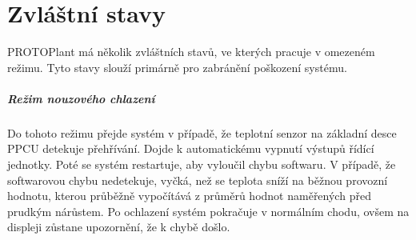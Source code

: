 \chapter{Zvláštní stavy}
PROTOPlant má několik zvláštních stavů, ve kterých pracuje v omezeném režimu.
Tyto stavy slouží primárně pro zabránění poškození systému.

\paragraph{Režim nouzového chlazení}
\label{paragraph:CoolingMode}
Do tohoto režimu přejde systém v případě, že teplotní senzor na základní desce PPCU detekuje přehřívání. 
Dojde k automatickému vypnutí výstupů řídící jednotky.
Poté se systém restartuje, aby vyloučil chybu softwaru.
V případě, že softwarovou chybu nedetekuje, vyčká, než se teplota sníží na běžnou provozní hodnotu, kterou průběžně vypočítává z průměrů hodnot naměřených před prudkým nárůstem.
Po ochlazení systém pokračuje v normálním chodu, ovšem na displeji zůstane upozornění, že k chybě došlo.

\newpage